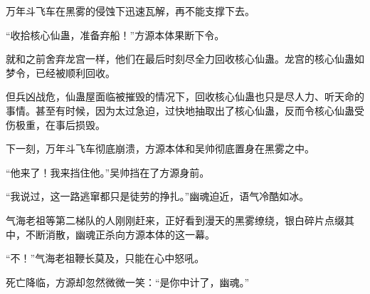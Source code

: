 \begin{this_body}
万年斗飞车在黑雾的侵蚀下迅速瓦解，再不能支撑下去。

“收拾核心仙蛊，准备弃船！”方源本体果断下令。

就和之前舍弃龙宫一样，他们在最后时刻尽全力回收核心仙蛊。龙宫的核心仙蛊如梦令，已经被顺利回收。

但兵凶战危，仙蛊屋面临被摧毁的情况下，回收核心仙蛊也只是尽人力、听天命的事情。甚至有时候，因为太过急迫，过快地抽取出了核心仙蛊，反而令核心仙蛊受伤极重，在事后损毁。

下一刻，万年斗飞车彻底崩溃，方源本体和吴帅彻底置身在黑雾之中。

“他来了！我来挡住他。”吴帅挡在了方源身前。

“我说过，这一路逃窜都只是徒劳的挣扎。”幽魂迫近，语气冷酷如冰。

气海老祖等第二梯队的人刚刚赶来，正好看到漫天的黑雾缭绕，银白碎片点缀其中，不断消散，幽魂正杀向方源本体的这一幕。

“不！”气海老祖鞭长莫及，只能在心中怒吼。

死亡降临，方源却忽然微微一笑：“是你中计了，幽魂。”

\end{this_body}

